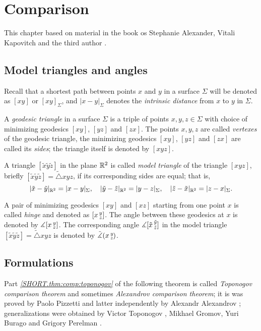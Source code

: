 \chapter{Comparison}

This chapter based on material in the book os Stephanie Alexander, Vitali Kapovitch and the third author \cite{alexander-kapovitch-petrunin2027}.

\section{Model triangles and angles}

Recall that a shortest path between points $x$ and $y$ in a surface $\Sigma$ will be denoted as $[xy]$ or $[xy]_\Sigma$, and
$|x-y|_\Sigma$ denotes the \emph{intrinsic distance} from $x$ to $y$ in $\Sigma$.

A \emph{geodesic triangle} in a surface $\Sigma$ is a triple of points $x,y,z\in \Sigma$ with choice of minimizing geodesics $[xy]$, $[yz]$ and $[zx]$.
The points $x,y,z$ are called {}\emph{vertexes} of the geodesic triangle,
the minimizing geodesics $[xy]$, $[yz]$ and $[zx]$ are called its {}\emph{sides};
the triangle itself is denoted by $[xyz]$.

A triangle $[\tilde x\tilde y\tilde z]$ in the plane $\mathbb{R}^2$ is called \emph{model triangle} of the triangle $[xyz]$,
briefly $[\tilde x\tilde y\tilde z]=\tilde\triangle xyz$,
\index{$\tilde\triangle$}
if its corresponding sides are equal;
that is,
\[|\tilde x-\tilde y|_{\mathbb{R}^2}=|x-y|_\Sigma,
\quad
|\tilde y-\tilde z|_{\mathbb{R}^2}=|y-z|_\Sigma,
\quad
|\tilde z-\tilde x|_{\mathbb{R}^2}=|z-x|_\Sigma.
\]

A pair of minimizing geodesics $[xy]$ and $[xz]$ starting from one point $x$ is called \emph{hinge} and denoted as $[x\,{}^{y}_{z}]$.
The angle between these geodesics at $x$ is denoted by $\measuredangle[x\,{}^{y}_{z}]$.
The corresponding angle $\measuredangle[\tilde x\,{}^{\tilde y}_{\tilde z}]$ in the model triangle $[\tilde x\tilde y\tilde z]=\tilde\triangle xyz$ is denoted by $\tilde\measuredangle(x\,{}^{y}_{z}\hspace{-0.2ex})$.

\section{Formulations}

Part \textit{\ref{SHORT.thm:comp:toponogov}} of the following theorem is called \emph{Toponogov comparison theorem} and sometimes \emph{Alexandrov comparison theorem};
it is was proved by Paolo Pizzetti \cite{pizzetti} and latter independently by Alexandr Alexandrov \cite{alexandrov}; 
generalizations were obtained by  Victor Toponogov \cite{toponogov}, Mikhael Gromov, Yuri Burago and Grigory Perelman \cite{BGP}.

